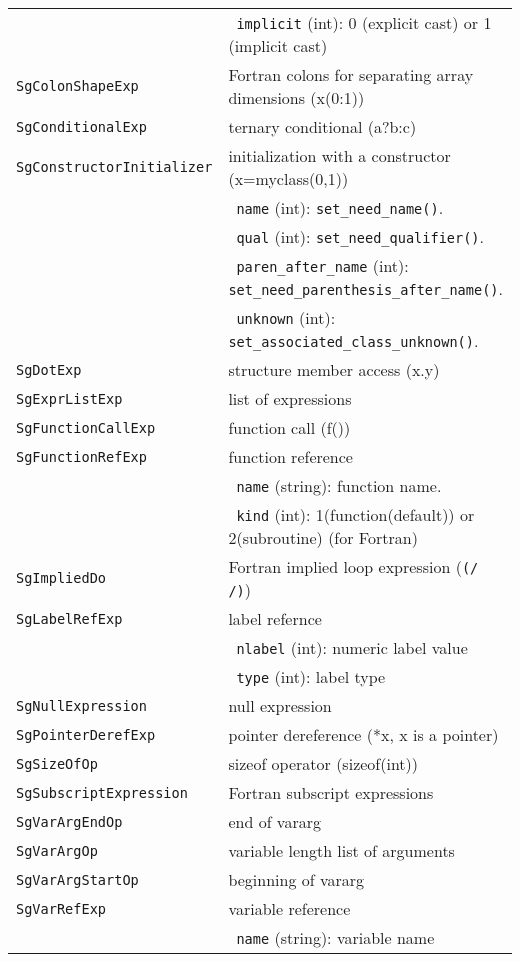 \begin{longtable}[l]{l|p{10cm}}
 & ~\texttt{implicit} (int): 0 (explicit cast) or 1 (implicit cast)\\
 \texttt{SgColonShapeExp} & Fortran colons for separating array dimensions (x(0:1))\\
 \texttt{SgConditionalExp} & ternary conditional (a?b:c)\\
 \texttt{SgConstructorInitializer} & initialization with a constructor (x=myclass(0,1))\\
 & ~\texttt{name} (int): \texttt{set\_need\_name()}. \\
 & ~\texttt{qual} (int): \texttt{set\_need\_qualifier()}.\\
 & ~\texttt{paren\_after\_name} (int): \texttt{set\_need\_parenthesis\_after\_name()}.\\
 & ~\texttt{unknown} (int): \texttt{set\_associated\_class\_unknown()}.\\
 \texttt{SgDotExp} & structure member access (x.y)\\
 \texttt{SgExprListExp} & list of expressions \\
 \texttt{SgFunctionCallExp} & function call  (f())\\
 \texttt{SgFunctionRefExp} & function reference\\
 & ~\texttt{name} (string): function name. \\
 & ~\texttt{kind} (int): 1(function(default)) or 2(subroutine) (for Fortran)\\
 \texttt{SgImpliedDo} & Fortran implied loop expression (\texttt{(/ /)})\\
 \texttt{SgLabelRefExp} & label refernce\\
 & ~\texttt{nlabel} (int): numeric label value\\
 & ~\texttt{type} (int): label type\\
 \texttt{SgNullExpression} & null expression \\
 \texttt{SgPointerDerefExp} & pointer dereference (*x, x is a pointer)\\
 \texttt{SgSizeOfOp} & sizeof operator (sizeof(int))\\
 \texttt{SgSubscriptExpression} & Fortran subscript expressions \\
 \texttt{SgVarArgEndOp} & end of vararg\\
 \texttt{SgVarArgOp} & variable length list of arguments \\
 \texttt{SgVarArgStartOp} & beginning of vararg\\
 \texttt{SgVarRefExp} & variable reference \\
 & ~\texttt{name} (string): variable name \\
\end{longtable}


